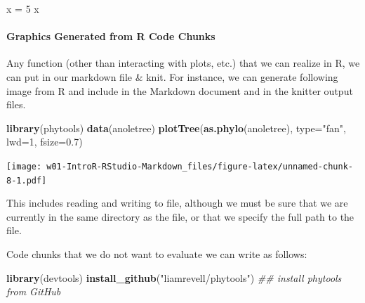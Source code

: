 \documentclass[
]{article}
\newenvironment{Shaded}{\begin{snugshade}}{\end{snugshade}}
\newcommand{\CommentTok}[1]{\textcolor[rgb]{0.56,0.35,0.01}{\textit{#1}}}
\newcommand{\DataTypeTok}[1]{\textcolor[rgb]{0.13,0.29,0.53}{#1}}
\newcommand{\DecValTok}[1]{\textcolor[rgb]{0.00,0.00,0.81}{#1}}
\newcommand{\FloatTok}[1]{\textcolor[rgb]{0.00,0.00,0.81}{#1}}
\newcommand{\KeywordTok}[1]{\textcolor[rgb]{0.13,0.29,0.53}{\textbf{#1}}}
\newcommand{\NormalTok}[1]{#1}
\newcommand{\StringTok}[1]{\textcolor[rgb]{0.31,0.60,0.02}{#1}}
\begin{document}
\begin{Shaded}
\begin{Highlighting}[]
\NormalTok{x =}\StringTok{ }\DecValTok{5}
\NormalTok{x}
\end{Highlighting}
\end{Shaded}

\hypertarget{graphics-generated-from-r-code-chunks}{%
\paragraph{Graphics Generated from R Code
Chunks}\label{graphics-generated-from-r-code-chunks}}

Any function (other than interacting with plots, etc.) that we can
realize in R, we can put in our markdown file \& knit. For instance, we
can generate following image from R and include in the Markdown document
and in the knitter output files.

\begin{Shaded}
\begin{Highlighting}[]
\KeywordTok{library}\NormalTok{(phytools)}
\KeywordTok{data}\NormalTok{(anoletree)}
\KeywordTok{plotTree}\NormalTok{(}\KeywordTok{as.phylo}\NormalTok{(anoletree), }\DataTypeTok{type=}\StringTok{"fan"}\NormalTok{, }\DataTypeTok{lwd=}\DecValTok{1}\NormalTok{, }\DataTypeTok{fsize=}\FloatTok{0.7}\NormalTok{)}
\end{Highlighting}
\end{Shaded}

\texttt{[image: w01-IntroR-RStudio-Markdown\_files/figure-latex/unnamed-chunk-8-1.pdf]}

This includes reading and writing to file, although we must be sure that
we are currently in the same directory as the file, or that we specify
the full path to the file.

Code chunks that we do not want to evaluate we can write as follows:

\begin{Shaded}
\begin{Highlighting}[]
\KeywordTok{library}\NormalTok{(devtools)}
\KeywordTok{install\_github}\NormalTok{(}\StringTok{"liamrevell/phytools"}\NormalTok{) }\CommentTok{\#\# install phytools from GitHub}
\end{Highlighting}
\end{Shaded}
\end{document}
